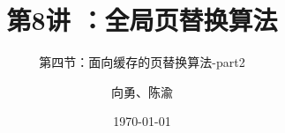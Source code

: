 



\title[第8讲]{第8讲 ：全局页替换算法} %
\subtitle{第四节：面向缓存的页替换算法-part2}
\author{向勇、陈渝} %
\date{\today} %




\begin{frame}
\titlepage %
\end{frame}

